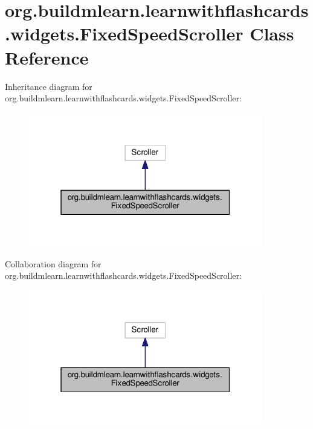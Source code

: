 \hypertarget{classorg_1_1buildmlearn_1_1learnwithflashcards_1_1widgets_1_1FixedSpeedScroller}{}\section{org.\+buildmlearn.\+learnwithflashcards.\+widgets.\+Fixed\+Speed\+Scroller Class Reference}
\label{classorg_1_1buildmlearn_1_1learnwithflashcards_1_1widgets_1_1FixedSpeedScroller}


Inheritance diagram for org.\+buildmlearn.\+learnwithflashcards.\+widgets.\+Fixed\+Speed\+Scroller\+:
\nopagebreak
\begin{figure}[H]
\begin{center}
\leavevmode
\includegraphics[width=289pt]{classorg_1_1buildmlearn_1_1learnwithflashcards_1_1widgets_1_1FixedSpeedScroller__inherit__graph}
\end{center}
\end{figure}


Collaboration diagram for org.\+buildmlearn.\+learnwithflashcards.\+widgets.\+Fixed\+Speed\+Scroller\+:
\nopagebreak
\begin{figure}[H]
\begin{center}
\leavevmode
\includegraphics[width=289pt]{classorg_1_1buildmlearn_1_1learnwithflashcards_1_1widgets_1_1FixedSpeedScroller__coll__graph}
\end{center}
\end{figure}
